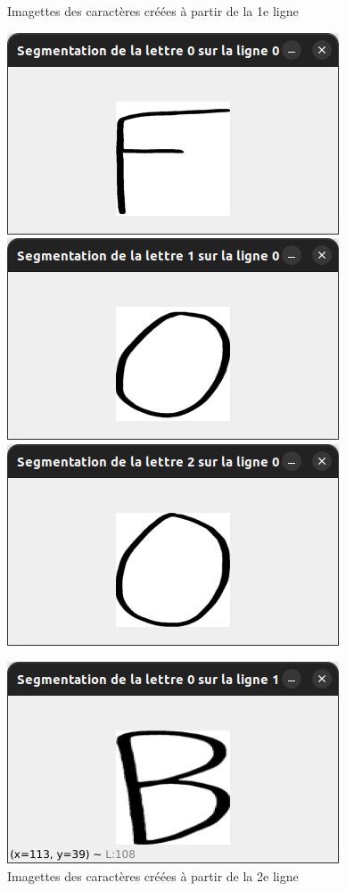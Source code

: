 \documentclass[a4paper]{article}
\begin{document}
			\begin{figure}[h!]
				\caption{Imagettes des caractères créées à partir de la 1e ligne}
				\includegraphics[scale=.3]{segmentation_F.png}
				\centering
				\includegraphics[scale=.3]{segmentation_O1.png}
				\centering
				\includegraphics[scale=.3]{segmentation_O2.png}
				\centering
				\caption{Imagettes des caractères créées à partir de la 2e ligne}
				\includegraphics[scale=.3]{segmentation_B.png}

\end{figure}
\end{document}

